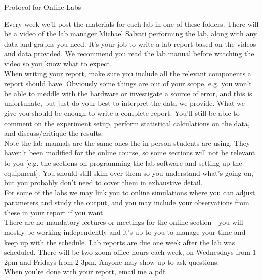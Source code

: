 \documentclass[11pt]{extarticle}
\begin{document}
\setlength{\parindent}{0pt}

\begin{center}
	\huge
	Protocol for Online Labs

	\vspace{0.5cm}
\end{center}

Every week we'll post the materials for each lab in one of these folders. There will be a video of the lab manager Michael Salvati performing the lab, along with any data and graphs you need. It's your job to write a lab report based on the videos and data provided. We recommend you read the lab manual before watching the video so you know what to expect. \\ 

When writing your report, make sure you include all the relevant components a report should have. Obviously some things are out of your scope, e.g. you won't be able to meddle with the hardware or investigate a source of error, and this is unfortunate, but just do your best to interpret the data we provide. What we give you should be enough to write a complete report. You'll still be able to comment on the experiment setup, perform statistical calculations on the data, and discuss/critique the results. \\ 

Note the lab manuals are the same ones the in-person students are using. They haven't been modified for the online course, so some sections will not be relevant to you [e.g. the sections on programming the lab software and setting up the equipment]. You should still skim over them so you understand what's going on, but you probably don't need to cover them in exhaustive detail. \\ 

For some of the labs we may link you to online simulations where you can adjust parameters and study the output, and you may include your observations from these in your report if you want. \\ 

There are no mandatory lectures or meetings for the online section---you will mostly be working independently and it's up to you to manage your time and keep up with the schedule. Lab reports are due one week after the lab was scheduled. There will be two zoom office hours each week, on Wednesdays from 1-2pm and Fridays from 2-3pm. Anyone may show up to ask questions. \\ 

When you're done with your report, email me a pdf. 
\end{document}
